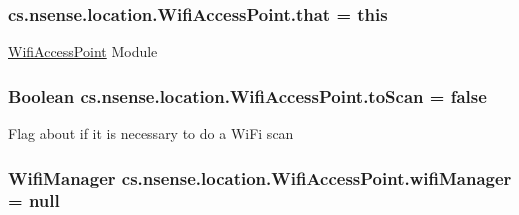 \hypertarget{classcs_1_1nsense_1_1location_1_1_wifi_access_point_acd9c4f5de8218e8ba2f0a918bb247dbc}{
\subsubsection[{that}]{ cs.\-nsense.\-location.\-Wifi\-Access\-Point.\-that = this\hspace{0.3cm}{\ttfamily [private]}}}\label{classcs_1_1nsense_1_1location_1_1_wifi_access_point_acd9c4f5de8218e8ba2f0a918bb247dbc}
\hyperlink{classcs_1_1nsense_1_1location_1_1_wifi_access_point}{Wifi\-Access\-Point} Module \hypertarget{classcs_1_1nsense_1_1location_1_1_wifi_access_point_aa14413027e5b08152a82d28e1d0167a8}{
\subsubsection[{to\-Scan}]{\setlength{\rightskip}{0pt plus 5cm}Boolean cs.\-nsense.\-location.\-Wifi\-Access\-Point.\-to\-Scan = false\hspace{0.3cm}{\ttfamily [private]}}}\label{classcs_1_1nsense_1_1location_1_1_wifi_access_point_aa14413027e5b08152a82d28e1d0167a8}
Flag about if it is necessary to do a Wi\-Fi scan \hypertarget{classcs_1_1nsense_1_1location_1_1_wifi_access_point_ae99d6dee6d3f9c42279da6ce87ff9a56}{
\subsubsection[{wifi\-Manager}]{\setlength{\rightskip}{0pt plus 5cm}Wifi\-Manager cs.\-nsense.\-location.\-Wifi\-Access\-Point.\-wifi\-Manager = null\hspace{0.3cm}{\ttfamily [private]}}}\label{classcs_1_1nsense_1_1location_1_1_wifi_access_point_ae99d6dee6d3f9c42279da6ce87ff9a56}
